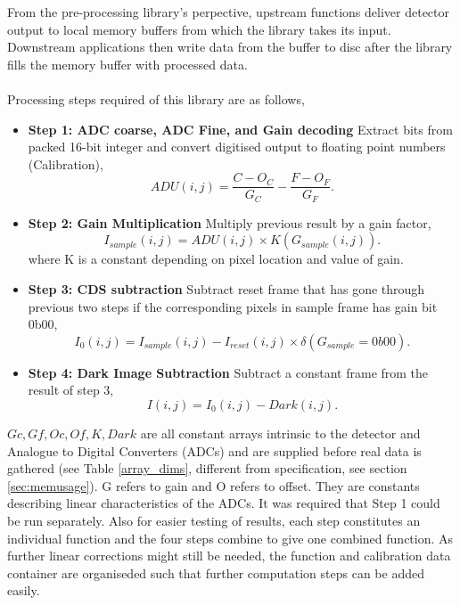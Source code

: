 \documentclass[journal]{IEEEtran}
\begin{document}
From the pre-processing library's perpective, upstream functions deliver detector output to local memory buffers from which the library takes its input. Downstream applications then write data from the buffer to disc after the library fills the memory buffer with processed data. \\ \\
Processing steps required of this library are as follows,
\begin{itemize}
 \item \textbf{Step 1: ADC coarse, ADC Fine, and Gain decoding} Extract bits from packed 16-bit integer and convert digitised output to floating point numbers (Calibration),
	\begin{equation}
		ADU(i,j) = \frac{C - O_C}{G_C} - \frac{F - O_F}{G_F}.
	\end{equation}
 \item \textbf{Step 2: Gain Multiplication} Multiply previous result by a gain factor,
	\begin{equation}
		I_{sample}(i,j) = ADU(i,j) \times K(G_{sample}(i,j)).
	\end{equation}
where K is a constant depending on pixel location and value of gain.	
 \item \textbf{Step 3: CDS subtraction} Subtract reset frame that has gone through previous two steps if the corresponding pixels in sample frame has gain bit 0b00,
	\begin{equation}	
		I_0(i,j) = I_{sample}(i,j) - I_{reset}(i,j) \times \delta(G_{sample}=0b00).
	\end{equation}
 \item \textbf{Step 4: Dark Image Subtraction} Subtract a constant frame from the result of step 3,
	\begin{equation}
		I(i,j) = I_0(i,j) - Dark(i,j).
	\end{equation}
\end{itemize}

$Gc, Gf, Oc, Of, K, Dark$ are all constant arrays intrinsic to the detector and Analogue to Digital Converters (ADCs) and are supplied before real data is gathered (see Table \ref{array_dims}, different from specification, see section \ref{sec:memusage}). G refers to gain and O refers to offset. They are constants describing linear characteristics of the ADCs. It was required that Step 1 could be run separately. Also for easier testing of results, each step constitutes an individual function and the four steps combine to give one combined function. As further linear corrections might still be needed, the function and calibration data container are organiseded such that further computation steps can be added easily.\\
\end{document}
